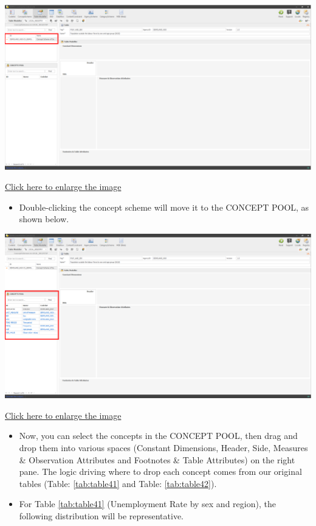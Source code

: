 \documentclass[
]{book}
\providecommand{\tightlist}{%
  \setlength{\itemsep}{0pt}\setlength{\parskip}{0pt}}
\begin{document}
\begin{center}\includegraphics[width=1\linewidth]{./images/image132} \end{center}

\href{images/image132.png}{Click here to enlarge the image}

\begin{itemize}
\tightlist
\item
  Double-clicking the concept scheme will move it to the CONCEPT POOL, as shown below.
\end{itemize}

\begin{center}\includegraphics[width=1\linewidth]{./images/image134} \end{center}

\href{images/image134.png}{Click here to enlarge the image}

\begin{itemize}
\item
  Now, you can select the concepts in the CONCEPT POOL, then drag and drop them into various spaces (Constant Dimensions, Header, Side, Measures \& Observation Attributes and Footnotes \& Table Attributes) on the right pane. The logic driving where to drop each concept comes from our original tables (Table: \ref{tab:table41} and Table: \ref{tab:table42}).
\item
  For Table \ref{tab:table41} (Unemployment Rate by sex and region), the following distribution will be representative.
\end{itemize}
\end{document}
